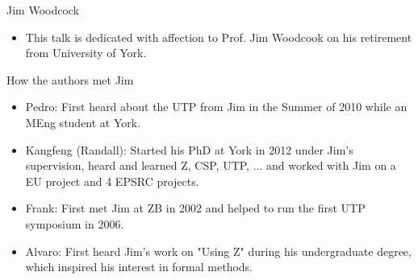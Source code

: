 \documentclass[%
    slidestop,%
    compress,%
    mathserif,%
    table,%
    usenames,%
    aspectratio=169,
    dvipsnames,%
]{beamer}%
\begin{document}

\begin{frame}{Jim Woodcock}
    \begin{itemize}
        \item This talk is dedicated with affection to Prof. Jim Woodcook on his retirement from University of York.
    \end{itemize}


    \pause \begin{block}{How the authors met Jim}
    \begin{itemize}
        \pause \item Pedro: First heard about the UTP from Jim in the Summer of 2010 while an MEng student at York.
        \pause \item Kangfeng (Randall): Started his PhD at York in 2012 under Jim's supervision, heard and learned Z, CSP, UTP, ... and worked with Jim on a EU project and 4 EPSRC projects.
        \pause \item Frank: First met Jim at ZB in 2002 and helped to run the first UTP symposium in 2006.
        \pause \item Alvaro: First heard Jim's work on "Using Z" during his undergraduate degree, which inspired his interest in formal methods.
    \end{itemize}
    \end{block}



\end{frame}
\end{document}
